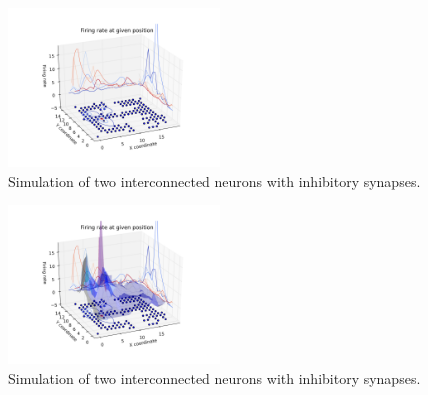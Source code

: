 \documentclass[12pt,a4paper,twocolumn]{article}
\begin{document}
\begin{figure}[htbp]
\centering
\includegraphics[width=0.5\textwidth]{figure9_a.png}
\caption{Simulation of two interconnected neurons with inhibitory synapses.\label{fig:part4b}}
\vspace{0.2cm}
\end{figure}
\begin{figure}[htbp]
\centering
\includegraphics[width=0.5\textwidth]{figure9_b.png}
\caption{Simulation of two interconnected neurons with inhibitory synapses.\label{fig:part4b}}
\vspace{0.2cm}
\end{figure}
\end{document}

